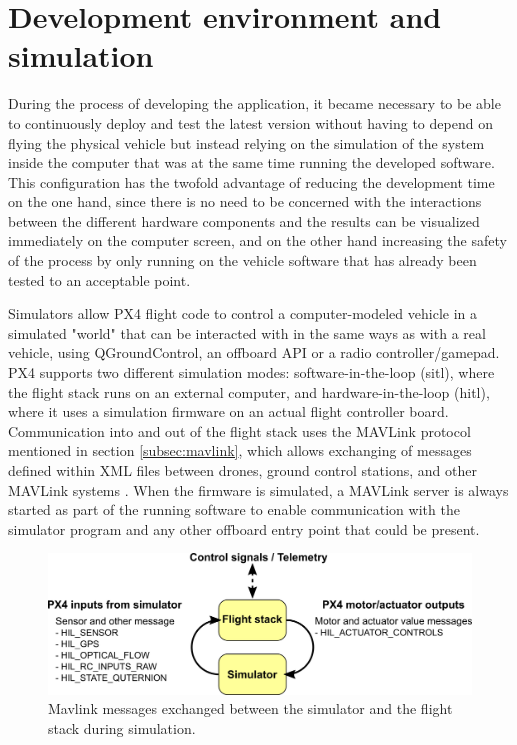 \section{Development environment and simulation}
\label{sec:devenv}
During the process of developing the application, it became necessary to be able to continuously deploy and test the latest version without having to depend on flying the physical vehicle but instead relying on the simulation of the system inside the computer that was at the same time running the developed software.
This configuration has the twofold advantage of reducing the development time on the one hand, since there is no need to be concerned with the interactions between the different hardware components and the results can be visualized immediately on the computer screen, and on the other hand increasing the safety of the process by only running on the vehicle software that has already been tested to an acceptable point.

Simulators allow PX4 flight code to control a computer-modeled vehicle in a simulated "world" that can be interacted with in the same ways as with a real vehicle, using QGroundControl, an offboard API or a radio controller/gamepad. 
PX4 supports two different simulation modes: software-in-the-loop (\gls{sitl}), where the flight stack runs on an external computer, and hardware-in-the-loop (\gls{hitl}), where it uses a simulation firmware on an actual flight controller board.
Communication into and out of the flight stack uses the MAVLink protocol mentioned in section \ref{subsec:mavlink},
which allows exchanging of messages defined within XML files between drones, ground control stations, and other MAVLink systems \cite{mavlink}.
When the firmware is simulated, a MAVLink server is always started as part of the running software to enable communication with the simulator program and any other offboard entry point that could be present.


\begin{figure}
  \centering
  \includegraphics[width=\textwidth,keepaspectratio]{img/px4_simulator_messages.png}
  \caption{Mavlink messages exchanged between the simulator and the flight stack during simulation.}
  \label{fig:simulator-msgs}
\end{figure}

